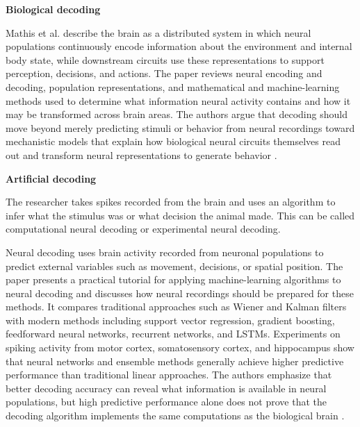 \documentclass{book}
\providecommand{\ProjectDeepHeading}[2]{%
    \par\medskip\noindent\textbf{#2}\par\smallskip
}
\begin{document}
    
    \ProjectDeepHeading{11}{Biological decoding}
        Mathis et al. describe the brain as a distributed system in which neural populations continuously encode information about the environment and internal body state, while downstream circuits use these representations to support perception, decisions, and actions. The paper reviews neural encoding and decoding, population representations, and mathematical and machine-learning methods used to determine what information neural activity contains and how it may be transformed across brain areas. The authors argue that decoding should move beyond merely predicting stimuli or behavior from neural recordings toward mechanistic models that explain how biological neural circuits themselves read out and transform neural representations to generate behavior \cite{mathis-2024-decoding-the-brain-from-neural-representations-to-mechanistic-models}.
    
    
    \ProjectDeepHeading{11}{Artificial decoding}
        The researcher takes spikes recorded from the brain and uses an algorithm to infer what the stimulus was or what decision the animal made. This can be called computational neural decoding or experimental neural decoding.
        
        Neural decoding uses brain activity recorded from neuronal populations to predict external variables such as movement, decisions, or spatial position. The paper presents a practical tutorial for applying machine-learning algorithms to neural decoding and discusses how neural recordings should be prepared for these methods. It compares traditional approaches such as Wiener and Kalman filters with modern methods including support vector regression, gradient boosting, feedforward neural networks, recurrent networks, and LSTMs. Experiments on spiking activity from motor cortex, somatosensory cortex, and hippocampus show that neural networks and ensemble methods generally achieve higher predictive performance than traditional linear approaches. The authors emphasize that better decoding accuracy can reveal what information is available in neural populations, but high predictive performance alone does not prove that the decoding algorithm implements the same computations as the biological brain \cite{glaser-2020-machine-learning-for-neural-decoding}.
        
\end{document}
